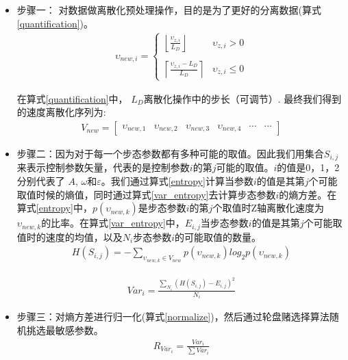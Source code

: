 \begin{itemize}
	\item 步骤一： 对数据做离散化预处理操作，目的是为了更好的分离数据(算式\ref{quantification})。
	\begin{eqnarray}\label{quantification}
	\upsilon_{new,i}=\left\{
	\begin{array}{lr}
	\left \lfloor \frac{\upsilon_{z,i}}{L_{D}} \right \rfloor&\upsilon_{z,i}> 0\\
	\\
	\left \lceil \frac{\upsilon_{z,i}-L_{D}}{L_{D}} \right \rceil&\upsilon_{z,i}\leq 0
	\end{array}
	\right.
	\end{eqnarray}
	
	在算式\ref{quantification}中， $L_{D}$离散化操作中的步长（可调节）. 最终我们得到的速度离散化序列为:
	\begin{eqnarray}\label{newMember}
	V_{new}=\begin{bmatrix}
	\upsilon_{new,1} & \upsilon_{new,2} & \upsilon_{new,3} & \upsilon_{new,4} & \cdots & \cdots
	\end{bmatrix}
	\end{eqnarray}
	
	\item 步骤二：因为对于每一个步态参数都有多种可能的取值。因此我们用集合$S_{i,j}$来表示控制参数矢量，代表的是控制参数$i$的第$j$可能的取值。$i$的值是0，1，2分别代表了 $A$, $\omega$和$\varepsilon$。我们通过算式\ref{entropy}计算当参数$i$的值是其第$j$个可能取值时候的熵值，同时通过算式\ref{var_entropy}去计算步态参数$i$的熵方差。在算式\ref{entropy}中，$p(\upsilon_{new,k})$是步态参数$i$的第$j$个取值时Z轴离散化速度为$\upsilon_{new,k}$的比率。在算式\ref{var_entropy}中，$E_{i,j}$当步态参数$i$的值是其第$j$个可能取值时的速度的均值，以及$N_{i}$步态参数$i$的可能取值的数量。
	\begin{eqnarray}\label{entropy}
	H(S_{i,j})=-\sum _{\upsilon_{new,k}\in V_{new}}p(\upsilon_{new,k})log_{2}p(\upsilon_{new,k})
	\end{eqnarray}
	
	\begin{eqnarray}\label{var_entropy}
	Var_{i}=\frac{\sum _{N_{i}}(H(S_{i,j})-E_{i,j})^{2}}{N_{i}}
	\end{eqnarray}
	
	\item 步骤三：对熵方差进行归一化(算式\ref{normalize})，然后通过轮盘赌选择算法随机挑选最敏感参数。
	\begin{eqnarray}\label{normalize}
	R_{Var_{i}}=\frac{Var_{i}}{\sum Var_{i}}
	\end{eqnarray}
	
\end{itemize}

